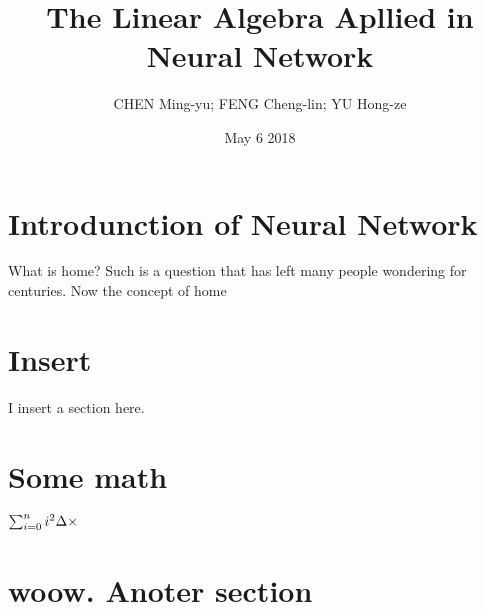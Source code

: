 \documentclass{article}
\title{The Linear Algebra Apllied in Neural Network}
\author{CHEN Ming-yu; FENG Cheng-lin; YU Hong-ze}
\date{May 6 2018}
\begin{document}
\maketitle
\begin{spacing}{2.0}

\section{Introdunction of Neural Network}

What is home? Such is a question that has left many people wondering for centuries. Now the concept of home \\


\section{Insert}
I insert a section here.




\section{Some math}\label{sec:section1}
\begin{math}
	$$\sum_{i=0}^{n}i^2$$\\
	$$\Delta$$\\
	$$\times$$
\end{math}\\

\section{woow. Anoter section}


\end{spacing}
\end{document}

